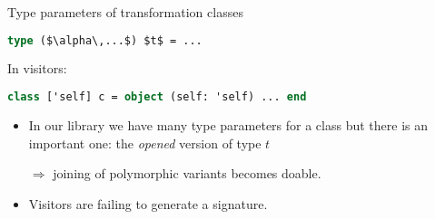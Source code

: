 \documentclass{beamer}
\theoremstyle{definition}
\theoremstyle{plain} %
\begin{document}
\begin{comment}
Objects and classes generated by visitors have a very peculiar way to specify type 
parameters for a class, like this. In our library we generate a lot of type parameters
but there is an important one: the opened version of type that is being processed. It 
matters when we are generating `map` transformation (a.k.a. functor) for polymorphic
variant types. This explicit type parameter allows to take two classes that perform
transformations of polymorphic variant types and join them using inheritance. The 
visitors officially doesn't support polymorphic variants but we beleive that with 
their approach it will be troublesome to implement this.

And the last thing that we want to mention here is that `visitors` library 
relies on a type checker a lot and it can't
generate type signatures in the interface file by design. Our work doesn't suffer 
from this problem which should be better from engineering point of view.
\end{comment}

\begin{frame}[fragile]{Type parameters of transformation classes}
\begin{lstlisting}[language=ocaml] 
type ($\alpha\,...$) $t$ = ...  
\end{lstlisting}
In visitors: 
\begin{lstlisting}[language=ocaml] 
class ['self] c = object (self: 'self) ... end
\end{lstlisting}
\begin{itemize}
 \item In our library we have many type parameters for a class but there is an important one: the \textit{opened} version of type $t$

$\Rightarrow$ joining of polymorphic variants becomes doable.
\item Visitors are failing to generate a signature.
\end{itemize}
\end{frame}

\begin{comment}
  This is almost all. A number of concluding remarks:

  1. We are near the end of development, there are still some things to improve

  2. We know that there is some performance penalty due to the intensive use of objects. Perhaps, we should
  investigate this issue more closely and, perhaps, spend some time optimizing (specialization?)

  3. We support only homogenious plugins so far (``\lstinline|show|'' can not use ``\lstinline|compare|''); we are not
  sure we should go farther in this direction

  4. It is interesting if the framework can be used to implement ad-hoc polymorphism (actually, yes) and existentials (don't know)

  5. Our work gives a good case of using objects when they are really needed  
\end{comment}
\end{document}
